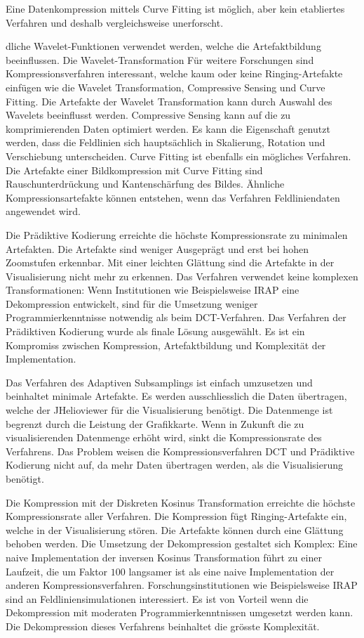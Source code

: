  Eine Datenkompression mittels Curve Fitting ist möglich, aber kein etabliertes Verfahren und deshalb vergleichsweise unerforscht.

dliche Wavelet-Funktionen verwendet werden, welche die Artefaktbildung beeinflussen. Die Wavelet-Transformation
Für weitere Forschungen sind Kompressionsverfahren interessant, welche kaum oder keine Ringing-Artefakte einfügen wie die Wavelet Transformation, Compressive Sensing und Curve Fitting. Die Artefakte der Wavelet Transformation kann durch Auswahl des Wavelets beeinflusst werden. Compressive Sensing kann auf die zu komprimierenden Daten optimiert werden. Es kann die Eigenschaft genutzt werden, dass die Feldlinien sich hauptsächlich in Skalierung, Rotation und Verschiebung unterscheiden. Curve Fitting ist ebenfalls ein mögliches Verfahren. Die Artefakte einer Bildkompression mit Curve Fitting sind Rauschunterdrückung und Kantenschärfung des Bildes. Ähnliche Kompressionsartefakte können entstehen, wenn das Verfahren Feldliniendaten angewendet wird.






Die Prädiktive Kodierung erreichte die höchste Kompressionsrate zu minimalen Artefakten. Die Artefakte sind weniger Ausgeprägt und erst bei hohen Zoomstufen erkennbar. Mit einer leichten Glättung sind die Artefakte in der Visualisierung nicht mehr zu erkennen. Das Verfahren verwendet keine komplexen Transformationen: Wenn Institutionen wie Beispielsweise IRAP \cite{website:irap} eine Dekompression entwickelt, sind für die Umsetzung weniger Programmierkenntnisse notwendig als beim DCT-Verfahren. Das Verfahren der Prädiktiven Kodierung wurde als finale Lösung ausgewählt. Es ist ein Kompromiss zwischen Kompression, Artefaktbildung und Komplexität der Implementation.

Das Verfahren des Adaptiven Subsamplings ist einfach umzusetzen und beinhaltet minimale Artefakte. Es werden ausschliesslich die Daten übertragen, welche der JHelioviewer für die Visualisierung benötigt. Die Datenmenge ist begrenzt durch die Leistung der Grafikkarte. Wenn in Zukunft die zu visualisierenden Datenmenge erhöht wird, sinkt die Kompressionsrate des Verfahrens. Das Problem weisen die Kompressionsverfahren DCT und Prädiktive Kodierung nicht auf, da mehr Daten übertragen werden, als die Visualisierung benötigt.

Die Kompression mit der Diskreten Kosinus Transformation erreichte die höchste Kompressionsrate aller Verfahren. Die Kompression fügt Ringing-Artefakte ein, welche in der Visualisierung stören. Die Artefakte können durch eine Glättung behoben werden. Die Umsetzung der Dekompression gestaltet sich Komplex: Eine naive Implementation der inversen Kosinus Transformation führt zu einer Laufzeit, die um Faktor $100$ langsamer ist als eine naive Implementation der anderen Kompressionsverfahren. Forschungsinstitutionen wie Beispielsweise IRAP \cite{website:irap} sind an Feldliniensimulationen interessiert. Es ist von Vorteil wenn die Dekompression mit moderaten Programmierkenntnissen umgesetzt werden kann. Die Dekompression dieses Verfahrens beinhaltet die grösste Komplexität.